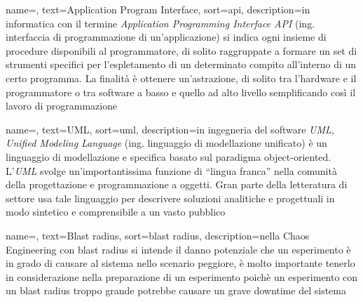 
\renewcommand{\acronymname}{Acronimi e abbreviazioni}




{
    name=,
    text=Application Program Interface,
    sort=api,
    description={in informatica con il termine \emph{Application Programming Interface API} (ing. interfaccia di programmazione di un'applicazione) si indica ogni insieme di procedure disponibili al programmatore, di solito raggruppate a formare un set di strumenti specifici per l'espletamento di un determinato compito all'interno di un certo programma. La finalità è ottenere un'astrazione, di solito tra l'hardware e il programmatore o tra software a basso e quello ad alto livello semplificando così il lavoro di programmazione}
}

{
    name=,
    text=UML,
    sort=uml,
    description={in ingegneria del software \emph{UML, Unified Modeling Language} (ing. linguaggio di modellazione unificato) è un linguaggio di modellazione e specifica basato sul paradigma object-oriented. L'\emph{UML} svolge un'importantissima funzione di ``lingua franca'' nella comunità della progettazione e programmazione a oggetti. Gran parte della letteratura di settore usa tale linguaggio per descrivere soluzioni analitiche e progettuali in modo sintetico e comprensibile a un vasto pubblico}
}

{
    name=,
    text=Blast radius,
    sort=blast radius,
    description={nella Chaos Engineering con blast radius si intende il danno potenziale che un esperimento è in grado di causare al sistema nello scenario peggiore, è molto importante tenerlo in considerazione nella preparazione di un esperimento poichè un esperimento con un blast radius troppo grande potrebbe causare un grave downtime del sistema}
}

